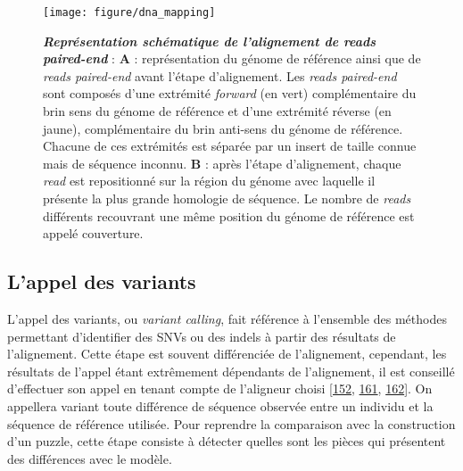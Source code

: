 \documentclass[12pt,a4paper,twoside]{ugathesis}
\theoremstyle{definition}
\theoremstyle{definition}
\theoremstyle{definition}
\theoremstyle{remark}
\begin{document}
\begin{figure}

{\centering \texttt{[image: figure/dna\_mapping]} 

}

\caption[Représentation schématique de l'alignement de reads paired-end]{\textbf{\emph{Représentation schématique de
l'alignement de reads paired-end}} : \textbf{A} : représentation du
génome de référence ainsi que de \emph{reads paired-end} avant l'étape
d'alignement. Les \emph{reads paired-end} sont composés d'une extrémité
\emph{forward} (en vert) complémentaire du brin sens du génome de
référence et d'une extrémité réverse (en jaune), complémentaire du brin
anti-sens du génome de référence. Chacune de ces extrémités est séparée
par un insert de taille connue mais de séquence inconnu. \textbf{B} :
après l'étape d'alignement, chaque \emph{read} est repositionné sur la
région du génome avec laquelle il présente la plus grande homologie de
séquence. Le nombre de \emph{reads} différents recouvrant une même
position du génome de référence est appelé couverture.}\label{fig:picdnamapping}
\end{figure}














\newpage

\subsection{L'appel des variants}\label{varcall}

L'appel des variants, ou \emph{variant calling}, fait référence à
l'ensemble des méthodes permettant d'identifier des SNVs ou des indels à
partir des résultats de l'alignement. Cette étape est souvent
différenciée de l'alignement, cependant, les résultats de l'appel étant
extrêmement dépendants de l'alignement, il est conseillé d'effectuer son
appel en tenant compte de l'aligneur choisi
{[}\protect\hyperlink{ref-Nielsen2011}{152},
\protect\hyperlink{ref-DePristo2011}{161},
\protect\hyperlink{ref-Lunter2011}{162}{]}. On appellera variant toute
différence de séquence observée entre un individu et la séquence de
référence utilisée. Pour reprendre la comparaison avec la construction
d'un puzzle, cette étape consiste à détecter quelles sont les pièces qui
présentent des différences avec le modèle.
\end{document}

